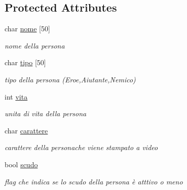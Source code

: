 \subsection*{Protected Attributes}
\begin{DoxyCompactItemize}
\item 
\hypertarget{classPersona_a15d4ded972e8bdd3f02e89c6ccb71b73}{}char \hyperlink{classPersona_a15d4ded972e8bdd3f02e89c6ccb71b73}{nome} \mbox{[}50\mbox{]}\label{classPersona_a15d4ded972e8bdd3f02e89c6ccb71b73}

\begin{DoxyCompactList}\small\item\em nome della persona \end{DoxyCompactList}\item 
\hypertarget{classPersona_ae7069f0467a3b2f1d269c1a143b730eb}{}char \hyperlink{classPersona_ae7069f0467a3b2f1d269c1a143b730eb}{tipo} \mbox{[}50\mbox{]}\label{classPersona_ae7069f0467a3b2f1d269c1a143b730eb}

\begin{DoxyCompactList}\small\item\em tipo della persona (Eroe,Aiutante,Nemico) \end{DoxyCompactList}\item 
\hypertarget{classPersona_a1e784d3a56cddd6ba8e81387df1efc7b}{}int \hyperlink{classPersona_a1e784d3a56cddd6ba8e81387df1efc7b}{vita}\label{classPersona_a1e784d3a56cddd6ba8e81387df1efc7b}

\begin{DoxyCompactList}\small\item\em unita di vita della persona \end{DoxyCompactList}\item 
\hypertarget{classPersona_a1fff44e46be477b79413387307b0aaff}{}char \hyperlink{classPersona_a1fff44e46be477b79413387307b0aaff}{carattere}\label{classPersona_a1fff44e46be477b79413387307b0aaff}

\begin{DoxyCompactList}\small\item\em carattere della personache viene stampato a video \end{DoxyCompactList}\item 
\hypertarget{classPersona_a1af99e040deeb7015e7e99bb2a5128f4}{}bool \hyperlink{classPersona_a1af99e040deeb7015e7e99bb2a5128f4}{scudo}\label{classPersona_a1af99e040deeb7015e7e99bb2a5128f4}

\begin{DoxyCompactList}\small\item\em flag che indica se lo scudo della persona è atttivo o meno \end{DoxyCompactList}\end{DoxyCompactItemize}


